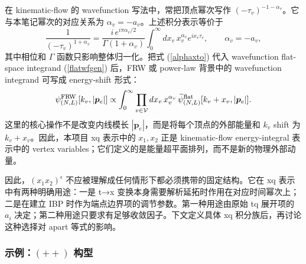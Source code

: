 ﻿\documentclass[a4paper,11pt]{article}
\begin{document}
在 kinematic-flow 的 wavefunction 写法中，常把顶点幂次写作 $(-\tau_v)^{-1-\alpha_v}$。它与本笔记幂次的对应关系为 $\alpha_v=-a_v$。上述积分表示等价于
\begin{equation}
    \frac{1}{(-\tau_v)^{1+\alpha_v}}
    =
    \frac{i\,e^{i\pi\alpha_v/2}}{\Gamma(1+\alpha_v)}
    \int_0^\infty dx_v\,x_v^{\alpha_v}e^{ix_v\tau_v},
    \qquad \alpha_v=-a_v,
    \label{alphaxto}
\end{equation}
其中相位和 $\Gamma$ 函数只影响整体归一化。把式 (\ref{alphaxto}) 代入 wavefunction flat-space integrand (\ref{flatwfgen}) 后，FRW 或 power-law 背景中的 wavefunction integrand 可写成 energy-shift 形式：
\begin{equation}
    \psi^{\rm FRW}_{(N,L)}[k_v,|\boldsymbol{p}_e|]
    \propto
    \int_0^\infty\prod_{v\in\mathcal{V}}dx_v\,x_v^{\alpha_v}\,
    \widetilde{\psi}^{\rm flat}_{(N,L)}[k_v+x_v,|\boldsymbol{p}_e|].
    \label{wfenergyshift}
\end{equation}
这里的核心操作不是改变内线模长 $|\boldsymbol{p}_e|$，而是将每个顶点的外部能量和 $k_v$ shift 为 $k_v+x_v$。因此，本项目 xq 表示中的 $x_1,x_2$ 正是 kinematic-flow energy-integral 表示中的 vertex variables；它们定义的是能量超平面排列，而不是新的物理外部动量。

因此，$(x_1x_2)^\epsilon$ 不应被理解成任何情形下都必须携带的固定结构。它在 xq 表示中有两种明确用途：一是 t→x 变换本身需要解析延拓时作用在对应时间幂次上；二是在建立 IBP 时作为端点边界项的调节参数。第一种用途由原始 tq 展开项的 $a_i$ 决定；第二种用途只要求有足够收敛因子。下文定义具体 xq 积分族后，再讨论这种选择对 apart 等式的影响。

\subsubsection{示例：$(++)$ 构型}
\end{document}
